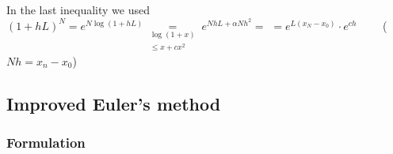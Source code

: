 \begin{remark}
  In the last inequality we used $(1+hL)^N = e^{N\log(1+hL)} \underset{\substack{\log(1+x)\\\leq x + cx^2}}{=} e^{NhL + \alpha Nh^2} =$ $=e^{L(x_N-x_0)}\cdot e^{ch}\qquad$ ($Nh = x_n-x_0$)
\end{remark}

\newpage

\subsection{Improved Euler's method} \label{imprEu}
\subsubsection{Formulation}
\begin{figure}[h]
    \centering
    

\end{figure}
